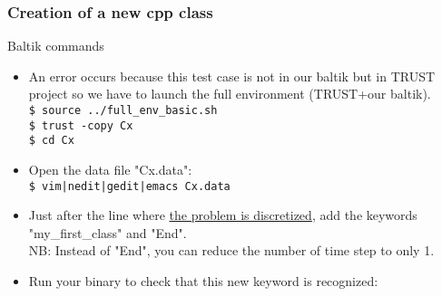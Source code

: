 \documentclass[10pt, hyperref={unicode=true,pdfusetitle, bookmarks=true,bookmarksnumbered=false,bookmarksopen=false, breaklinks=false,pdfborder={0 0 1},backref=true,colorlinks=true,linkcolor=darkblue,pageanchor, urlcolor=darkblue}]{beamer}
\begin{document}
\begin{frame}
\frametitle{Creation of a new cpp class}
\begin{block}{Baltik commands}

\begin{itemize}
\item An error occurs because this test case is not in our baltik but in TRUST project so we have to launch the full environment (TRUST+our baltik).\\
\texttt{\$ source ../full\_env\_basic.sh}\\
\texttt{\$ trust -copy Cx}\\
\texttt{\$ cd Cx}\\

\item Open the data file "Cx.data":\\
\texttt{\$ vim|nedit|gedit|emacs Cx.data}

\item Just after the line where \underline{the problem is discretized}, add the keywords "my\_first\_class" and "End".\\
NB: Instead of "End", you can reduce the number of time step to only 1.\\

\item Run your binary to check that this new keyword is recognized:\\
\end{itemize}

\end{block}
\end{frame}
\end{document}
